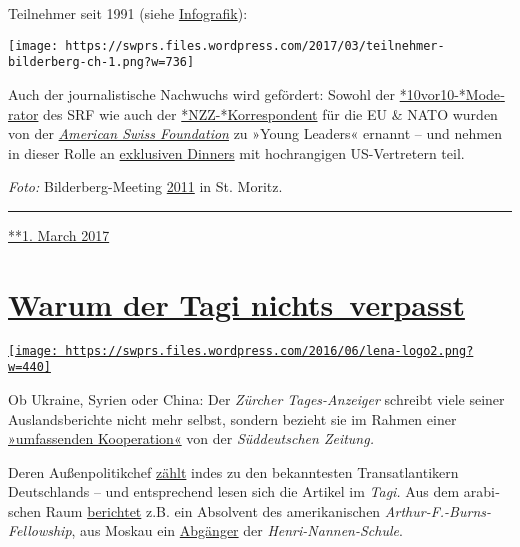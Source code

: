 Teilnehmer seit 1991 (siehe
\href{https://swprs.org/netzwerk-medien-schweiz/}{Info­grafik}):

\texttt{[image: https://swprs.files.wordpress.com/2017/03/teilnehmer-bilderberg-ch-1.png?w=736]}

Auch der journa­lis­tische Nach­wuchs wird ge­för­dert: Sowohl der
\href{http://www.americanswiss.org/news/arthur-honegger-spotlight/}{*10vor10-*​Mode­ra­tor}
des SRF wie auch der
\href{http://www.americanswiss.org/news/niklaus-nuspliger-spotlight/}{*NZZ-*Korres­pon­dent}
für die EU \& NATO wurden von der
\href{http://www.americanswiss.org/}{\emph{Ameri­can Swiss
Foun­da­tion}} zu »Young Leaders« ernannt -- und neh­men in dieser Rolle
an
\href{http://www.americanswiss.org/ambassador-barras-hosts-dinner-for-young-leaders-1/}{exklu­siven
Dinners} mit hoch­rang­igen US-Ver­tre­tern teil.

\emph{Foto:} Bilder­berg-Meeting
\href{https://www.theguardian.com/world/gallery/2011/jun/15/bilderberg-in-pictures}{2011}
in St. Moritz.

\begin{center}\rule{0.5\linewidth}{\linethickness}\end{center}

\href{https://swprs.org/2017/03/01/schweizer-medien-bilderberg-konferenz/}{**1.
March 2017}

\hypertarget{warum-der-tagi-nichts-verpasst}{%
\section{\texorpdfstring{\href{https://swprs.org/2017/03/01/warum-der-tagesanzeiger-nichts-verpasst/}{Warum
der Tagi
nichts~verpasst}}{Warum der Tagi nichts~verpasst}}\label{warum-der-tagi-nichts-verpasst}}

\href{https://swprs.org/2017/03/01/warum-der-tagesanzeiger-nichts-verpasst/}{\texttt{[image: https://swprs.files.wordpress.com/2016/06/lena-logo2.png?w=440]}}

Ob Ukraine, Syrien oder Chi­na: Der \emph{Zürcher Tages-Anzeiger}
schreibt viele seiner Aus­lands­berichte nicht mehr selbst, sondern
bezieht sie im Rah­men einer
\href{https://www.tagesanzeiger.ch/schweiz/standard/In-eigener-Sache/story/24648194}{»umfassenden
Ko­ope­ra­tion«} von der \emph{Süd­deut­schen Zeitung.}

Deren Außen­politik­chef
\href{https://swprs.org/netzwerk-medien-deutschland/}{zählt} indes zu
den bekanntesten Trans­at­lan­tikern Deutsch­lands -- und ent­spre­chend
le­sen sich die Arti­kel im \emph{Tagi.} Aus dem ara­bi­schen Raum
\href{https://web.archive.org/web/20170606085220/http://www.icfj.org/sites/default/files/Kr\%C3\%BCger.pdf}{berichtet}
z.B. ein Absol­vent des ameri­ka­ni­schen
\emph{Arthur-F.-Burns-Fellowship}, aus Mos­kau ein
\href{https://spiegelkabinett-blog.blogspot.com/2016/09/julian-hans-von-der-suddeutschen.html}{Ab­gänger}
der \emph{Henri-Nannen-Schule}.

